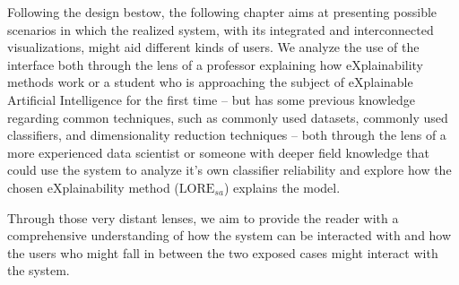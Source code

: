 

Following the design bestow, the following chapter aims at presenting possible scenarios in which the realized system, with its integrated and interconnected visualizations, might aid different kinds of users.
We analyze the use of the interface both through the lens of a professor explaining how eXplainability methods work or a student who is approaching the subject of eXplainable Artificial Intelligence for the first time -- but has some previous knowledge regarding common techniques, such as commonly used datasets, commonly used classifiers, and dimensionality reduction techniques -- both through the lens of a more experienced data scientist or someone with deeper field knowledge that could use the system to analyze it's own classifier reliability and explore how the chosen eXplainability method ($\text{LORE}_{sa}$) explains the model.

Through those very distant lenses, we aim to provide the reader with a comprehensive understanding of how the system can be interacted with and how the users who might fall in between the two exposed cases might interact with the system.